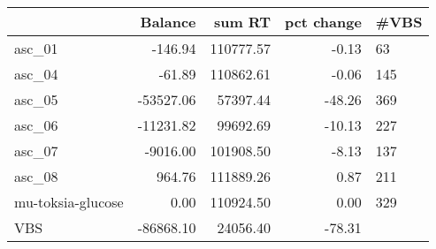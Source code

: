 \begin{tabular}{lrrrl}
\toprule
{} &   Balance &     sum RT &  pct change & \#VBS \\
\midrule
asc\_01            &   -146.94 &  110777.57 &       -0.13 &   63 \\
asc\_04            &    -61.89 &  110862.61 &       -0.06 &  145 \\
asc\_05            & -53527.06 &   57397.44 &      -48.26 &  369 \\
asc\_06            & -11231.82 &   99692.69 &      -10.13 &  227 \\
asc\_07            &  -9016.00 &  101908.50 &       -8.13 &  137 \\
asc\_08            &    964.76 &  111889.26 &        0.87 &  211 \\
mu-toksia-glucose &      0.00 &  110924.50 &        0.00 &  329 \\
VBS               & -86868.10 &   24056.40 &      -78.31 &      \\
\bottomrule
\end{tabular}
